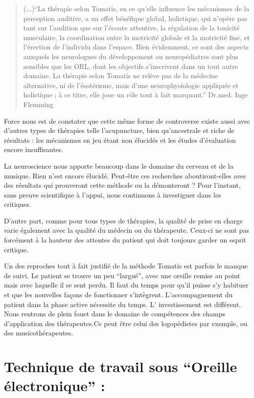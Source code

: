 \documentclass[12pt,french]{report}
\makeatletter
\let\SF@@footnote\footnote
\def\footnote{\ifx\protect\@typeset@protect
    \expandafter\SF@@footnote
  \else
    \expandafter\SF@gobble@opt
  \fi
}
\edef\SF@gobble@opt{\noexpand\protect
  \expandafter\noexpand\csname SF@gobble@opt \endcsname}
\makeatother
\begin{document}
\begin{quotation}
(...)``La thérapie selon Tomatis, en ce qu'elle influence les mécanismes
de la perception auditive, a un effet bénéfique global, holistique,
qui n'opère pas tant sur l'audition que sur l'écoute attentive, la
régulation de la tonicité musculaire, la coordination entre la motricité
globale et la motricité fine, et l'érection de l'individu dans l'espace.
Bien évidemment, ce sont des aspects auxquels les neurologues du développement
ou neuropédiatres sont plus sensibles que les ORL, dont les objectifs
s'inscrivent dans un tout autre domaine. La thérapie selon Tomatis
ne relève pas de la médecine alternative, ni de l'ésotérisme, mais
d'une neurophysiologie appliquée et holistique ; à ce titre, elle
joue un rôle tout à fait marquant.''\footnote{Dr.med. Inge Flemming}
\end{quotation}
Force nous est de constater que cette même forme de controverse existe
aussi avec d'autres types de thérapies telle l'acupuncture, bien qu'ancestrale
et riche de résultats : les mécanismes en jeu étant non élucidés et
les études d'évaluation encore insuffisantes. 

La neuroscience nous apporte beaucoup dans le domaine du cerveau et
de la musique. Rien n'est encore élucidé. Peut-être ces recherches
aboutiront-elles avec des résultats qui prouveront cette méthode ou
la démonteront ? Pour l'instant, sans preuve scientifique à l'appui,
nous continuons à investiguer dans les critiques.

D'autre part, comme pour tous types de thérapies, la qualité de prise
en charge varie également avec la qualité du médecin ou du thérapeute.
Ceux-ci ne sont pas forcément à la hauteur des attentes du patient
qui doit toujours garder un esprit critique.

Un des reproches tout à fait justifié de la méthode Tomatis est parfois
le manque de suivi. Le patient se trouve un peu ``largué'', avec
une oreille remise au point mais avec laquelle il se sent perdu. Il
faut du temps pour qu'il puisse s'y habituer et que les nouvelles
façons de fonctionner s'intègrent. L'accompagnement du patient dans
la phase active nécessite du temps. L' investissement est différent.
Nous rentrons de plein fouet dans le domaine de compétences des champs
d'application des thérapeutes.Ce peut être celui des logopédistes
par exemple, ou des musicothérapeutes.

\section{Technique de travail sous ``Oreille électronique'' :}
\end{document}
